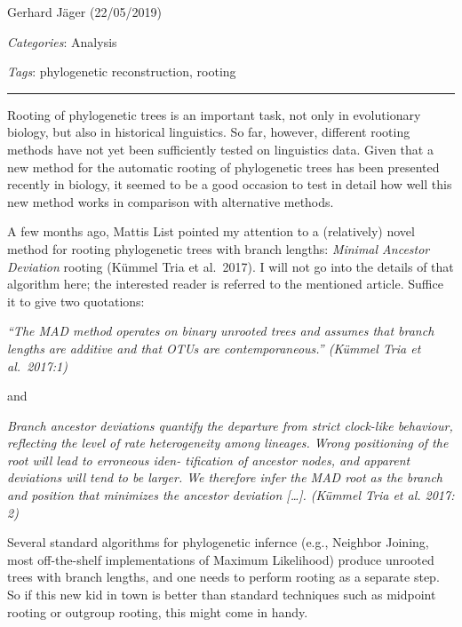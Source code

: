 \documentclass[
  a4paper,
  14pt,
  oneside,
  tablecaptionabove
]{scrbook}
\renewenvironment{quote}{\begin{customblockquote}\list{}{\rightmargin=0em\leftmargin=0em}%
\item\relax\color{blockquote-text}\ignorespaces}{\unskip\unskip\endlist\end{customblockquote}}
\begin{document}
Gerhard J\"{a}ger (22/05/2019)

\emph{Categories}: Analysis

\emph{Tags}: phylogenetic reconstruction, rooting

\begin{center}\rule{0.5\linewidth}{1pt}\end{center}

\leavevmode\hypertarget{write}{}%
Rooting of phylogenetic trees is an important task, not only in
evolutionary biology, but also in historical linguistics. So far,
however, different rooting methods have not yet been sufficiently tested
on linguistics data. Given that a new method for the automatic rooting
of phylogenetic trees has been presented recently in biology, it seemed
to be a good occasion to test in detail how well this new method works
in comparison with alternative methods.

{A few months ago, Mattis List pointed my attention to a (relatively)
novel method for rooting phylogenetic trees with branch lengths:
\emph{Minimal Ancestor Deviation} rooting (Kümmel Tria et al.~2017). I
will not go into the details of that algorithm here; the interested
reader is referred to the mentioned article. Suffice it to give two
quotations:}

\begin{quote}
{\emph{\enquote{The MAD method operates on binary unrooted trees and
assumes that branch lengths are additive and that OTUs are
contemporaneous.} (Kümmel Tria et al.~2017:1)}}
\end{quote}

{and}

\begin{quote}
{\emph{Branch ancestor deviations quantify the departure from strict
clock-like behaviour, reflecting the level of rate heterogeneity among
lineages. Wrong positioning of the root will lead to ­erroneous iden-
tification of ancestor nodes, and apparent deviations will tend to be
larger. We therefore infer the MAD root as the branch and position that
minimizes the ancestor deviation {[}\ldots{}{]}. (Kümmel Tria et al.
2017: 2)}}
\end{quote}

{Several standard algorithms for phylogenetic infernce (e.g., Neighbor
Joining, most off-the-shelf implementations of Maximum Likelihood)
produce unrooted trees with branch lengths, and one needs to perform
rooting as a separate step. So if this new kid in town is better than
standard techniques such as midpoint rooting or outgroup rooting, this
might come in handy.}
\end{document}
